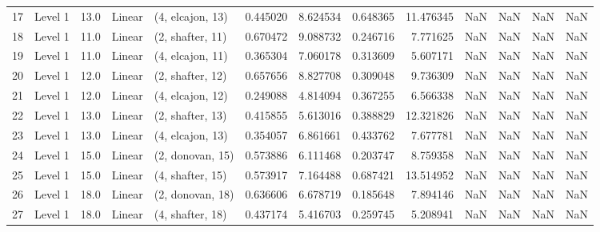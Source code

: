 \begin{tabular}{llrllrrrrrrrr}
17 &   Level 1 &   13.0 &      Linear &  (4, elcajon, 13) &   0.445020 &   8.624534 &  0.648365 &  11.476345 &                  NaN &                    NaN &                 NaN &                   NaN \\
18 &   Level 1 &   11.0 &      Linear &  (2, shafter, 11) &   0.670472 &   9.088732 &  0.246716 &   7.771625 &                  NaN &                    NaN &                 NaN &                   NaN \\
19 &   Level 1 &   11.0 &      Linear &  (4, elcajon, 11) &   0.365304 &   7.060178 &  0.313609 &   5.607171 &                  NaN &                    NaN &                 NaN &                   NaN \\
20 &   Level 1 &   12.0 &      Linear &  (2, shafter, 12) &   0.657656 &   8.827708 &  0.309048 &   9.736309 &                  NaN &                    NaN &                 NaN &                   NaN \\
21 &   Level 1 &   12.0 &      Linear &  (4, elcajon, 12) &   0.249088 &   4.814094 &  0.367255 &   6.566338 &                  NaN &                    NaN &                 NaN &                   NaN \\
22 &   Level 1 &   13.0 &      Linear &  (2, shafter, 13) &   0.415855 &   5.613016 &  0.388829 &  12.321826 &                  NaN &                    NaN &                 NaN &                   NaN \\
23 &   Level 1 &   13.0 &      Linear &  (4, elcajon, 13) &   0.354057 &   6.861661 &  0.433762 &   7.677781 &                  NaN &                    NaN &                 NaN &                   NaN \\
24 &   Level 1 &   15.0 &      Linear &  (2, donovan, 15) &   0.573886 &   6.111468 &  0.203747 &   8.759358 &                  NaN &                    NaN &                 NaN &                   NaN \\
25 &   Level 1 &   15.0 &      Linear &  (4, shafter, 15) &   0.573917 &   7.164488 &  0.687421 &  13.514952 &                  NaN &                    NaN &                 NaN &                   NaN \\
26 &   Level 1 &   18.0 &      Linear &  (2, donovan, 18) &   0.636606 &   6.678719 &  0.185648 &   7.894146 &                  NaN &                    NaN &                 NaN &                   NaN \\
27 &   Level 1 &   18.0 &      Linear &  (4, shafter, 18) &   0.437174 &   5.416703 &  0.259745 &   5.208941 &                  NaN &                    NaN &                 NaN &                   NaN \\

\end{tabular}
